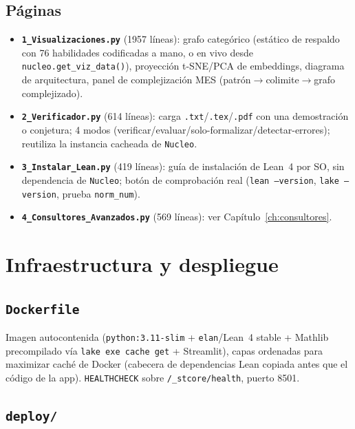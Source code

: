 \documentclass[11pt,a4paper]{report}
\newcommand{\code}[1]{\texttt{#1}}
\begin{document}
\section{P\'aginas}

\begin{itemize}
  \item \textbf{\code{1_Visualizaciones.py}} (1957 l\'ineas): grafo categ\'orico (est\'atico de respaldo con 76 habilidades codificadas a mano, o en vivo desde \code{nucleo.get_viz_data()}), proyecci\'on t-SNE/PCA de embeddings, diagrama de arquitectura, panel de complejizaci\'on MES (patr\'on$\to$colimite$\to$grafo complejizado).
  \item \textbf{\code{2_Verificador.py}} (614 l\'ineas): carga \code{.txt}/\code{.tex}/\code{.pdf} con una demostraci\'on o conjetura; 4 modos (verificar/evaluar/solo-formalizar/detectar-errores); reutiliza la instancia cacheada de \code{Nucleo}.
  \item \textbf{\code{3_Instalar_Lean.py}} (419 l\'ineas): gu\'ia de instalaci\'on de Lean~4 por SO, sin dependencia de \code{Nucleo}; bot\'on de comprobaci\'on real (\code{lean --version}, \code{lake --version}, prueba \code{norm_num}).
  \item \textbf{\code{4_Consultores_Avanzados.py}} (569 l\'ineas): ver Cap\'itulo~\ref{ch:consultores}.
\end{itemize}

\chapter{Infraestructura y despliegue}

\section{\code{Dockerfile}}

Imagen autocontenida (\code{python:3.11-slim} + \code{elan}/Lean~4 stable + Mathlib precompilado v\'ia \code{lake exe cache get} + Streamlit), capas ordenadas para maximizar cach\'e de Docker (cabecera de dependencias Lean copiada antes que el c\'odigo de la app). \code{HEALTHCHECK} sobre \code{/\_stcore/health}, puerto 8501.

\section{\code{deploy/}}
\end{document}
